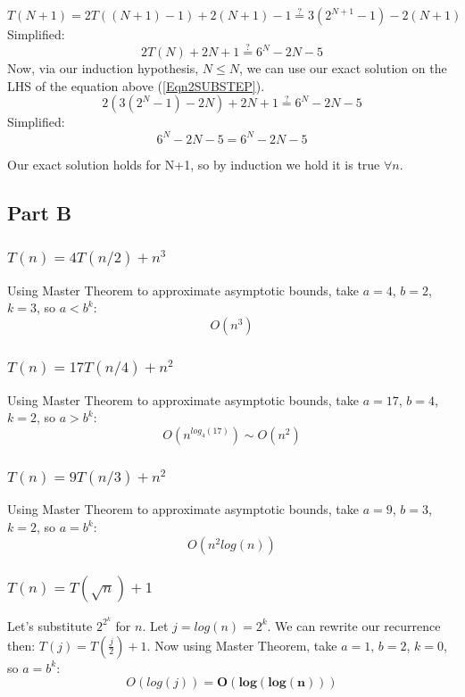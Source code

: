 \documentclass[conference]{styles/acmsiggraph}
\newcommand{\?}{\stackrel{?}{=}}
\begin{document}
\begin{equation}
    T(N+1) = 2T((N+1)-1)+2(N+1)-1 \? 3(2^{N+1}-1)-2(N+1)
\end{equation}
Simplified:
\begin{equation} \label{Eqn2SUBSTEP}
    2T(N) + 2N + 1 \? 6^{N}-2N-5
\end{equation}
Now, via our induction hypothesis,  $N \leq N$, we can use our exact solution on the LHS of the equation above (\ref{Eqn2SUBSTEP}).
\begin{equation}
    2(3(2^{N}-1)-2N) + 2N + 1 \? 6^{N}-2N-5
\end{equation}
Simplified:
\begin{equation}
    6^{N}-2N-5 = 6^{N}-2N-5
\end{equation}

Our exact solution holds for N+1, so by induction we hold it is true $\forall n$. \\





\subsection{Part B}

\subsubsection{$T(n) = 4T(n/2)+n^3$}
Using Master Theorem to approximate asymptotic bounds, take $a = 4$, $b = 2$, $k = 3$, so $a < b^k$: \\
$$O(n^3)$$

\subsubsection{$T(n) = 17T(n/4)+n^2$}
Using Master Theorem to approximate asymptotic bounds, take $a = 17$, $b = 4$, $k = 2$, so $a > b^k$: \\
$$O(n^{log_{4}(17)}) \sim O(n^{2})$$

\subsubsection{$T(n) = 9T(n/3)+n^2$}
Using Master Theorem to approximate asymptotic bounds, take $a = 9$, $b = 3$, $k = 2$, so $a = b^k$: \\
$$O(n^{2}log(n))$$

\subsubsection{$T(n)=T(\sqrt{n})+1$}
Let's substitute $2^{2^k}$ for $n$. Let $j = log(n) = 2^k$.  We can rewrite our recurrence then: $T(j) = T(\frac{j}{2}) + 1$.  Now using Master Theorem, take $a = 1$, $b = 2$, $k = 0$, so $a = b^k$: \\
$$O(log(j)) = \mathbf{O(log(log(n)))}$$
\end{document}
